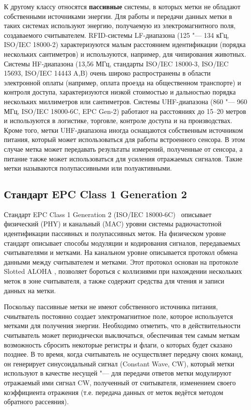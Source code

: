 К другому классу относятся \textbf{пассивные} системы, в которых метки не обладают собственными источниками энергии. Для работы и передачи данных метки в таких системах используют энергию, получаемую из электромагнитного поля, создаваемого считывателем. RFID-системы LF-диапазона (125 "--- 134 кГц, ISO/IEC 18000-2) характеризуются малым расстоянием идентификации (порядка нескольких сантиметров) и используются, например, для чипирования животных. Системы HF-диапазона (13,56 МГц, стандарты ISO/IEC 18000-3, ISO/IEC 15693, ISO/IEC 14443 A,B) очень широко распространены в области электронной оплаты (например, оплата проезда на общественном транспорте) и контроля доступа, характеризуются низкой стоимостью и дальностью порядка нескольких миллиметров или сантиметров. Системы UHF-диапазона (860 "--- 960 МГц, ISO/IEC 18000-6C, EPC Gen-2) работают на расстояниях до 15--20 метров и используются в логистике, торговле, контроле доступа и на производствах. Кроме того, метки UHF-диапазона иногда оснащаются собственным источником питания, который может использоваться для работы встроенного сенсора. В этом случае метка может передавать результаты измерений, полученные от сенсора, а питание также может использоваться для усиления отражаемых сигналов. Такие метки называются полупассивными или полуактивными.


\subsection{Стандарт EPC Class 1 Generation 2}

Стандарт EPC Class 1 Generation 2 (ISO/IEC 18000-6C)~\cite{StdGen2} описывает физический (PHY) и канальный (MAC) уровни системы радиочастотной идентификации пассивных и полупассивных меток. На физическом уровне стандарт описывает способы модуляции и кодирования сигналов, передаваемых считывателями и метками. На канальном уровне описывается протокол обмена данными между считывателем и метками. Этот протокол основан на протоколе Slotted ALOHA \cite{Abramson1970, Roberts1975}, позволяет бороться с коллизиями при нахождении нескольких меток в зоне считывателя, а также содержит средства для чтения и записи данных на метки.

Поскольку пассивные метки не имеют собственного источника питания, счиытватель постоянно создает электромагнитное поле, которое используется метками для получения энергии. Необходимо отметить, что в действительности считыватель может периодически выключаться, обеспечивая тем самым меткам возможность сбросить некоторые регистры и флаги, о которых будет сказано позднее. В то время, когда считыватель не осуществляет передачу своих команд, он генерирует синусоидальный сигнал (Constant Wave, CW), который метки используют в качестве несущей "--- для передачи ответов метки модулируют отражаемый ими сигнал CW, полученный от считывателя, изменением своего коэффициента отражения (т.е. передача данных от меток ведётся методом обратного рассеяния).


